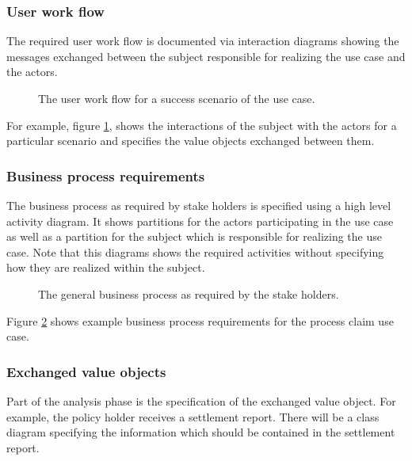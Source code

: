 \documentclass{IOS-Book-Article}
\begin{document}

\subsubsection{User work flow}

The required user work flow is documented via interaction diagrams showing the messages exchanged 
between the subject responsible for realizing the use case and the actors. 

\begin{figure}[thb]
  \centering
  \caption{The user work flow for a success scenario of the use case.}
  \label{fig:userWorkflowSuccess}
\end{figure}

For example, figure \ref{fig:userWorkflowSuccess}, shows the interactions of the subject with the actors for a particular
scenario and specifies the value objects exchanged between them.


\subsubsection{Business process requirements}

The business process as required by stake holders is specified using a high level activity diagram. 
It shows partitions for
the actors participating in the use case as well as a partition for the subject which is responsible for realizing the use
case. Note that this diagrams shows the required activities without specifying how they are realized within the subject.

\begin{figure}[thb]
  \centering
  \caption{The general business process as required by the stake holders.}
  \label{fig:userWorkflowGeneral}
\end{figure}

Figure \ref{fig:userWorkflowGeneral} shows  example business process requirements for the process claim use case.


\subsubsection{Exchanged value objects}

Part of the analysis phase is the specification of the exchanged value object.  For example, the policy holder receives
a settlement report. There will be a class diagram specifying the information which should be contained in the
settlement report.
\end{document}
